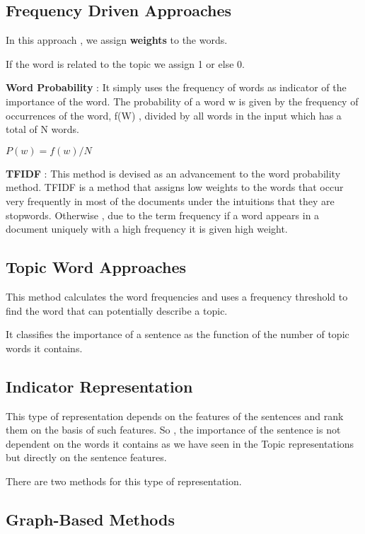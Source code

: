 \documentclass{article}
\begin{document}
\subsection{Frequency Driven Approaches}

In this approach , we assign \textbf{weights} to the words.

If the word is related to the topic we assign 1 or else 0.


\textbf{Word Probability} : It simply uses the frequency of words as indicator of the importance of the word. The probability of a word w is given by the frequency of occurrences of the word, f(W) , divided by all words in the input which has a total of N words.

$P(w) = f(w) / N $

\textbf{TFIDF} : This method is devised as an advancement to the word probability method. TFIDF is a method that assigns low weights to the words that occur very frequently in most of the documents under the intuitions that they are stopwords. Otherwise , due to the term frequency if a word appears in a document uniquely with a high frequency it is given high weight.

\subsection{Topic Word Approaches}

This method calculates the word frequencies and uses a frequency threshold to find the word that can potentially describe a topic.

It classifies the importance of a sentence as the function of the number of topic words it contains.

\subsection{Indicator Representation}

This type of representation depends on the features of the sentences and rank them on the basis of such features.
So , the importance of the sentence is not dependent on the words it contains as we have seen in the Topic representations but directly on the sentence features.

There are two methods for this type of representation.

\subsection{Graph-Based Methods}
\end{document}
